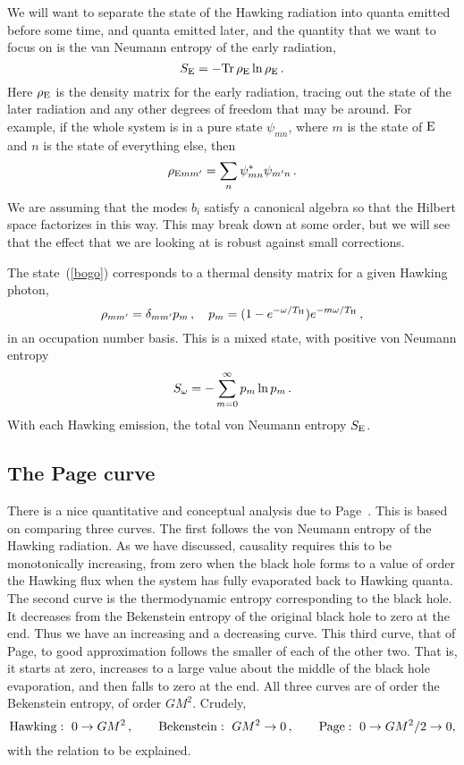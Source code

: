 \documentclass[12pt]{article}
\newcommand{\be}{\begin{equation}}
\newcommand{\ee}{\end{equation}}
\newcommand{\rmx}{\rm}
\begin{document}
We will want to separate the state of the Hawking radiation into quanta emitted before some time, and quanta emitted later, and the quantity that we want to focus on is the van Neumann entropy of the early radiation,
\be
S_{\rmx E} = - {\rm Tr}\, \rho_{\rmx E} \ln \rho_{\rmx E} \,.
\ee
Here $\rho_{\rmx E}$ is the density matrix for the early radiation, tracing out the state of the later radiation and any other degrees of freedom that may be around.  For example, if the whole system is in a pure state $\psi_{mn}$, where $m$ is the state of $\rmx E$ and $n$ is the state of everything else, then
\be
\rho_{{\rmx E}mm'} = \sum_n \psi^*_{mn} \psi_{m'n} \,.
\ee
We are assuming that the modes $b_i$ satisfy a canonical algebra so that the Hilbert space factorizes in this way.  This may break down at some order, but we will see that the effect that we are looking at is robust against small corrections.

The state~(\ref{bogo}) corresponds to a thermal density matrix for a given Hawking photon,
\be
\rho_{mm'}  = \delta_{mm'} p_m\,,\quad p_m = (1 - e^{-\omega/T_{\rmx H}}) e^{-m \omega/T_{\rmx H}} \,,
\ee
in an occupation number basis.  This is a mixed state, with positive von Neumann entropy 
\be
S_{\rm \omega} = - \sum_{m=0}^\infty p_m \ln p_m \,.
\ee
With each Hawking emission, the total von Neumann entropy $S_{\rmx E}$.


\subsection{The Page curve}

There is a nice quantitative and conceptual analysis due to Page~\cite{Page:1993wv}.  This is based on comparing three curves.  The first follows the von Neumann entropy of the Hawking radiation.  As we have discussed, causality requires this to be monotonically increasing, from zero when the black hole forms%
 to a value of order the Hawking flux when the system has fully evaporated back to Hawking quanta.  The second curve is the thermodynamic entropy corresponding to the black hole.  It decreases from the Bekenstein entropy of the  original black hole to zero at the end.  Thus we have an increasing and a decreasing curve.  This third curve, that of Page, to good approximation follows the smaller of each of the other two.  That is, it starts at zero, increases to a large value about the middle of the black hole evaporation, and then falls to zero at the end.  All three curves are of order the Bekenstein entropy, of order $G M^2$.  Crudely,
  \be
 {\rm Hawking}:\   0 \to G M^2\,,\quad\quad  {\rm Bekenstein}:\   G M^2 \to 0 \,,\quad\quad  {\rm Page}:\  0 \to G M^2/2  \to 0, \label{curve}
\ee
with the relation to be explained.
\end{document}
